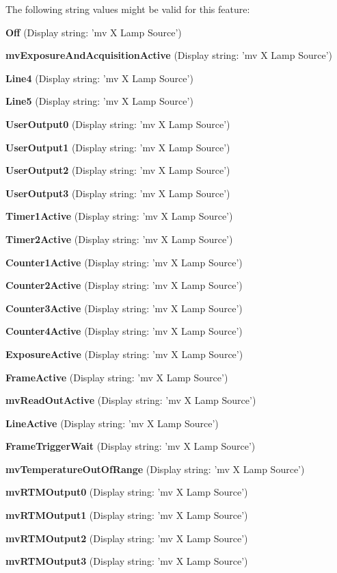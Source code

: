 The following string values might be valid for this feature\+:
\begin{DoxyItemize}
\item {\bfseries Off} (Display string\+: 'mv X Lamp Source')
\item {\bfseries mv\+Exposure\+And\+Acquisition\+Active} (Display string\+: 'mv X Lamp Source')
\item {\bfseries Line4} (Display string\+: 'mv X Lamp Source')
\item {\bfseries Line5} (Display string\+: 'mv X Lamp Source')
\item {\bfseries User\+Output0} (Display string\+: 'mv X Lamp Source')
\item {\bfseries User\+Output1} (Display string\+: 'mv X Lamp Source')
\item {\bfseries User\+Output2} (Display string\+: 'mv X Lamp Source')
\item {\bfseries User\+Output3} (Display string\+: 'mv X Lamp Source')
\item {\bfseries Timer1\+Active} (Display string\+: 'mv X Lamp Source')
\item {\bfseries Timer2\+Active} (Display string\+: 'mv X Lamp Source')
\item {\bfseries Counter1\+Active} (Display string\+: 'mv X Lamp Source')
\item {\bfseries Counter2\+Active} (Display string\+: 'mv X Lamp Source')
\item {\bfseries Counter3\+Active} (Display string\+: 'mv X Lamp Source')
\item {\bfseries Counter4\+Active} (Display string\+: 'mv X Lamp Source')
\item {\bfseries Exposure\+Active} (Display string\+: 'mv X Lamp Source')
\item {\bfseries Frame\+Active} (Display string\+: 'mv X Lamp Source')
\item {\bfseries mv\+Read\+Out\+Active} (Display string\+: 'mv X Lamp Source')
\item {\bfseries Line\+Active} (Display string\+: 'mv X Lamp Source')
\item {\bfseries Frame\+Trigger\+Wait} (Display string\+: 'mv X Lamp Source')
\item {\bfseries mv\+Temperature\+Out\+Of\+Range} (Display string\+: 'mv X Lamp Source')
\item {\bfseries mv\+R\+T\+M\+Output0} (Display string\+: 'mv X Lamp Source')
\item {\bfseries mv\+R\+T\+M\+Output1} (Display string\+: 'mv X Lamp Source')
\item {\bfseries mv\+R\+T\+M\+Output2} (Display string\+: 'mv X Lamp Source')
\item {\bfseries mv\+R\+T\+M\+Output3} (Display string\+: 'mv X Lamp Source')
\end{DoxyItemize}


